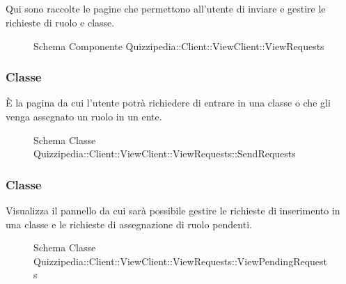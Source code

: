 \subsection{}
Qui sono raccolte le pagine che permettono all'utente di inviare e gestire le richieste di ruolo e classe.
\begin{figure}[H]
\centering
\noindent{}
\caption[Schema Componente Quizzipedia::Client::ViewClient::ViewRequests]{Schema Componente Quizzipedia::Client::ViewClient::ViewRequests}
\end{figure}
\subsubsection{Classe }
È la pagina da cui l'utente potrà richiedere di entrare in una classe o che gli venga assegnato un ruolo in un ente.
\begin{figure}[H]
\centering
\noindent{}
\caption[Schema Classe SendRequests]{Schema Classe Quizzipedia::Client::ViewClient::ViewRequests::SendRequests}
\end{figure}
\subsubsection{Classe }
Visualizza il pannello da cui sarà possibile gestire le richieste di inserimento in una classe e le richieste di assegnazione di ruolo pendenti.
\begin{figure}[H]
\centering
\noindent{}
\caption[Schema Classe ViewPendingRequests]{Schema Classe Quizzipedia::Client::ViewClient::ViewRequests::ViewPendingRequests}
\end{figure}
